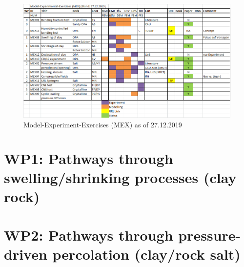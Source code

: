 \clearpage
\begin{figure}[hbtp]
\caption{Model-Experiment-Exercises (MEX) as of 27.12.2019}
\centering
\includegraphics[width=18cm,angle=90]{figures/mex-overview.png}
\end{figure}

\clearpage

\clearpage

\clearpage

\clearpage
\section*{WP1: Pathways through swelling/shrinking processes (clay rock)}

\clearpage
\clearpage

\clearpage
\clearpage

\clearpage

\clearpage
\clearpage
\section*{WP2: Pathways through pressure-driven percolation (clay/rock salt)}

\clearpage

\clearpage

\clearpage

\clearpage

\clearpage
